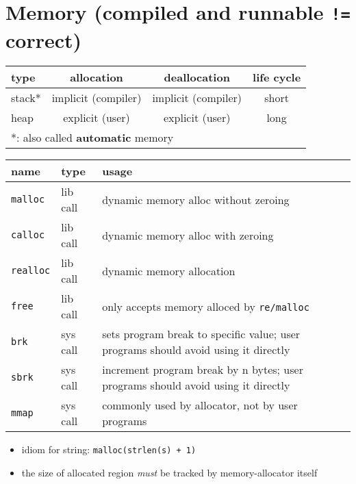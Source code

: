 \section*{Memory (compiled and runnable \texttt{!=} correct)}
\begin{tabular}[th!]{l|ccc}
  \hline
  type & allocation & deallocation & life cycle \\
  \hline
  stack* & implicit (compiler) & implicit (compiler) & short \\
  heap & explicit (user) & explicit (user) & long \\
  \hline
  \multicolumn{3}{l}{*: also called \textbf{automatic} memory}\\
  \hline
\end{tabular}
\begin{tabular}[th!]{l|lp{6.5cm}}
  \hline
  name & type & usage \\
  \hline
  \texttt{malloc} & lib call & dynamic memory alloc without zeroing \\
  \texttt{calloc} & lib call & dynamic memory alloc with zeroing\\
  \texttt{realloc} & lib call & dynamic memory allocation \\
  \texttt{free} & lib call & only accepts memory alloced by \texttt{re/malloc} \\
  \texttt{brk} & sys call & sets program break to specific value; user programs should avoid using it directly \\
  \texttt{sbrk} & sys call & increment program break by n bytes; user programs should avoid using it directly \\
  \texttt{mmap} & sys call & commonly used by allocator, not by user programs \\
  \hline
\end{tabular}
\begin{itemize}
\item idiom for string: \texttt{malloc(strlen(s) + 1)}
\item the size of allocated region \emph{must} be tracked by memory-allocator itself
\end{itemize}
